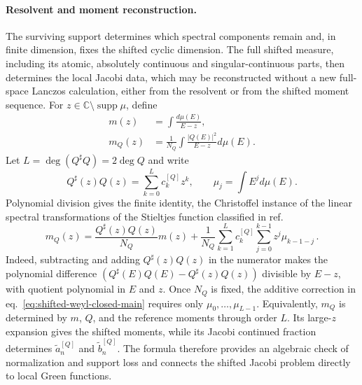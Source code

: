 \documentclass[a4paper,11pt]{article}
\def\dd{d}%
\theoremstyle{definition}
\theoremstyle{remark}
\newcommand{\dd}{\mathrm d}
\newcommand{\CC}{\mathbb C}
\newcommand{\supp}{\operatorname{supp}}
\newcommand{\Qsh}{Q^{\sharp}}
\begin{document}
\paragraph{Resolvent and moment reconstruction.}
The surviving support determines which spectral components remain and, in finite dimension, fixes the shifted cyclic dimension. The full shifted measure, including its atomic, absolutely continuous and singular-continuous parts, then determines the local Jacobi data, which may be reconstructed without a new full-space Lanczos calculation, either from the resolvent or from the shifted moment sequence.
For
$z\in\CC\setminus\supp\mu$, define
\begin{equation}
\begin{aligned}
   m(z)
   &=
   \int\frac{\dd\mu(E)}{E-z},\\
   m_Q(z)
   &=
   \frac{1}{N_Q}
   \int\frac{|Q(E)|^2}{E-z}\dd\mu(E).
\end{aligned}
   \label{eq:shifted-weyl-main}
\end{equation}
Let
$L=\deg(\Qsh Q)=2\deg Q$ and write
\begin{equation}
   \Qsh(z)Q(z)
   =
   \sum_{k=0}^{L}c_k^{[Q]}z^k,
   \qquad
   \mu_j=\int E^j\dd\mu(E).
   \label{eq:Qmultiplier-moments-main}
\end{equation}
Polynomial division gives the finite identity, the Christoffel instance of the linear spectral transformations of the Stieltjes function classified in ref.~\cite{Zhedanov1997}
\begin{equation}
   m_Q(z)
   =
   \frac{\Qsh(z)Q(z)}{N_Q}m(z)
   +
   \frac{1}{N_Q}
   \sum_{k=1}^{L}c_k^{[Q]}
   \sum_{j=0}^{k-1}z^j\mu_{k-1-j}\,.
   \label{eq:shifted-weyl-closed-main}
\end{equation}
Indeed, subtracting and adding $\Qsh(z)Q(z)$ in the numerator makes the polynomial difference
$(\Qsh(E)Q(E)-\Qsh(z)Q(z))$ divisible by $E-z$, with quotient polynomial in $E$ and $z$. Once $N_Q$ is fixed, the additive correction in
eq.~\eqref{eq:shifted-weyl-closed-main} requires only
$\mu_0,\ldots,\mu_{L-1}$. Equivalently, $m_Q$ is determined by $m$, $Q$, and the reference moments through order $L$. Its large-$z$ expansion gives the shifted moments, while its Jacobi continued fraction determines
$\widetilde a_n^{[Q]}$ and $\widetilde b_n^{[Q]}$. The formula therefore provides an algebraic check of normalization and support loss and connects the shifted Jacobi problem directly to local Green functions.
\end{document}
